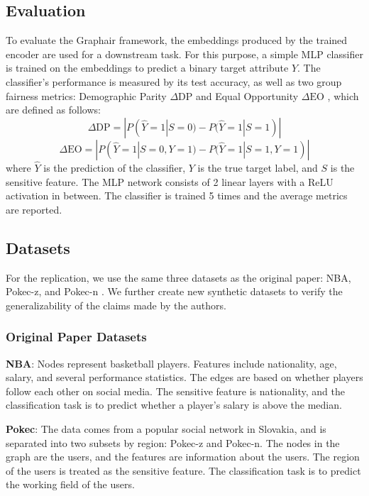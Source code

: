 \subsection{Evaluation}\label{Evaluation_protocol}
To evaluate the Graphair framework, the embeddings produced by the trained encoder are used for a downstream task. For this purpose, a simple MLP classifier is trained on the embeddings to predict a binary target attribute $Y$.
The classifier's performance is measured by its test accuracy, as well as two group fairness metrics: Demographic Parity $\Delta\text{DP}$ and Equal Opportunity $\Delta\text{EO}$ \citep{louizos2015variational, beutel2017data}, which are defined as follows:
$$\Delta\text{DP} = |P(\hat{Y}=1|S=0) - P(\hat{Y}=1|S=1)|$$ 
$$\Delta\text{EO} = |P(\hat{Y}=1|S=0, Y=1) - P(\hat{Y}=1|S=1, Y=1)|$$ 
where $\hat{Y}$ is the prediction of the classifier, $Y$ is the true target label, and $S$ is the sensitive feature. The MLP network consists of 2 linear layers with a ReLU activation in between. The classifier is trained 5 times and the average metrics are reported.

\subsection{Datasets}\label{sec:datasets}

For the replication, we use the same three datasets as the original paper: NBA, Pokec-z, and Pokec-n
\citep{DBLP:journals/corr/abs-2009-01454}. 
We further create new synthetic datasets to verify the generalizability of the claims made by the authors. 

\subsubsection{Original Paper Datasets}

\textbf{NBA}: Nodes represent basketball players. Features include nationality, age, salary, and several performance statistics.
The edges are based on whether players follow each other on social media. 
The sensitive feature is nationality, and the classification task is to predict whether a player's salary is above the median.

\textbf{Pokec}: The data comes from a popular social network in Slovakia, and is separated into two subsets by region: Pokec-z and Pokec-n. The nodes in the graph are the users, and the features are information about the users. The region of the users is treated as the sensitive feature. The classification task is to predict the working field of the users.


